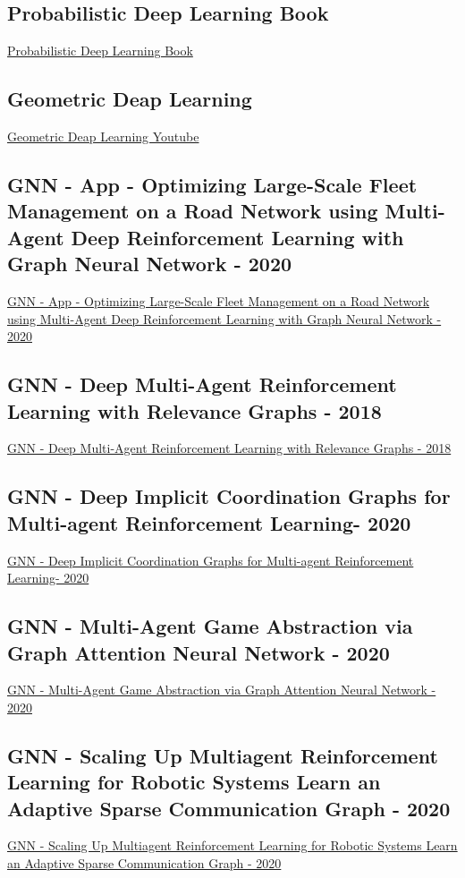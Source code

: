 \subsection{Probabilistic Deep Learning Book}
\href{https://probml.github.io/pml-book/book1.html}{Probabilistic Deep Learning Book}

\subsection{Geometric Deap Learning}
\href{https://www.youtube.com/watch?v=w6Pw4MOzMuo}{Geometric Deap Learning Youtube}

\subsection{GNN - App - Optimizing Large-Scale Fleet Management on a Road Network using Multi-Agent Deep Reinforcement Learning with Graph Neural Network - 2020}
\href{https://arxiv.org/abs/2011.06175}{GNN - App - Optimizing Large-Scale Fleet Management on a Road Network using Multi-Agent Deep Reinforcement Learning with Graph Neural Network - 2020}

\subsection{GNN - Deep Multi-Agent Reinforcement Learning with Relevance Graphs - 2018}
\href{https://arxiv.org/abs/1811.12557}{GNN - Deep Multi-Agent Reinforcement Learning with Relevance Graphs - 2018}

\subsection{GNN - Deep Implicit Coordination Graphs for Multi-agent Reinforcement Learning- 2020}
\href{https://arxiv.org/abs/2006.11438}{GNN - Deep Implicit Coordination Graphs for Multi-agent Reinforcement Learning- 2020}

\subsection{GNN - Multi-Agent Game Abstraction via Graph Attention Neural Network  - 2020}
\href{https://ojs.aaai.org/index.php/AAAI/article/view/6211}{GNN - Multi-Agent Game Abstraction via Graph Attention Neural Network  - 2020}

\subsection{GNN - Scaling Up Multiagent Reinforcement Learning for Robotic Systems Learn an Adaptive Sparse Communication Graph - 2020}
\href{https://arxiv.org/abs/2003.01040}{GNN - Scaling Up Multiagent Reinforcement Learning for Robotic Systems Learn an Adaptive Sparse Communication Graph - 2020}

